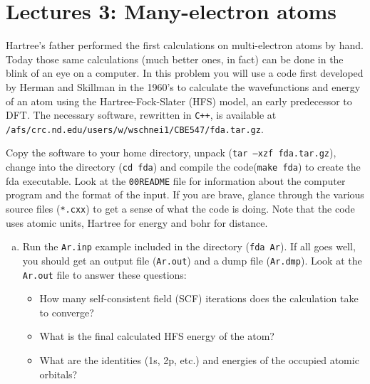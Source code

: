 \documentclass[11pt]{article}
\begin{document}
\section{Lectures 3: Many-electron atoms}
\label{sec:org6482b9f}

Hartree’s father performed the first calculations on multi-electron atoms by hand. Today those same calculations (much better ones, in fact) can be done in the blink of an eye on a computer. In this problem you will use a code first developed by Herman and Skillman in the 1960’s to calculate the wavefunctions and energy of an atom using the Hartree-Fock-Slater (HFS) model, an early predecessor to DFT. The necessary software, rewritten in \texttt{C++}, is available at \texttt{/afs/crc.nd.edu/users/w/wschnei1/CBE547/fda.tar.gz}.

Copy the software to your home directory, unpack (\texttt{tar –xzf fda.tar.gz}), change into the directory (\texttt{cd fda}) and compile the code(\texttt{make fda}) to create the fda executable. Look at the \texttt{00README} file for information about the computer program and the format of the input. If you are brave, glance through the various source files (\texttt{*.cxx}) to get a sense of what the code is doing. Note that the code uses atomic units, Hartree for energy and bohr for distance.

\begin{enumerate}[(a)]
\item Run the \texttt{Ar.inp} example included in the directory (\texttt{fda Ar}). If all goes well, you should get an output file (\texttt{Ar.out}) and a dump file (\texttt{Ar.dmp}). Look at the \texttt{Ar.out} file to answer these questions:

\begin{itemize}
\item How many self-consistent field (SCF) iterations does the calculation take to converge?

\item What is the final calculated HFS energy of the atom?

\item What are the identities (1s, 2p, etc.) and energies of the occupied atomic orbitals?
\end{itemize}
\end{enumerate}
\end{document}
